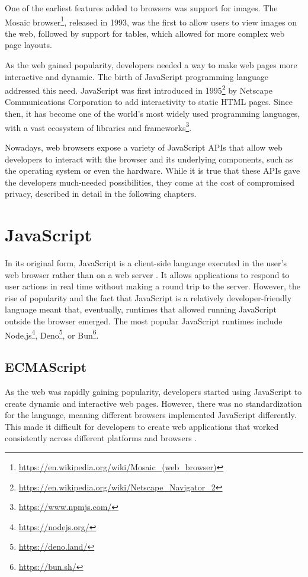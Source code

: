 One of the earliest features added to browsers was support for images. The Mosaic browser\footnote{\url{https://en.wikipedia.org/wiki/Mosaic_(web_browser)}}, released in 1993, was the first to allow users to view images on the web, followed by support for tables, which allowed for more complex web page layouts.

As the web gained popularity, developers needed a way to make web pages more interactive and dynamic. The birth of JavaScript programming language addressed this need. JavaScript was first introduced in 1995\footnote{\url{https://en.wikipedia.org/wiki/Netscape_Navigator_2}} by Netscape Communications Corporation to add interactivity to static HTML pages. Since then, it has become one of the world's most widely used programming languages, with a vast ecosystem of libraries and frameworks\footnote{\url{https://www.npmjs.com/}}.

Nowadays, web browsers expose a variety of JavaScript APIs that allow web developers to interact with the browser and its underlying components, such as the operating system or even the hardware. While it is true that these APIs gave the developers much-needed possibilities, they come at the cost of compromised privacy, described in detail in the following chapters.

\section{JavaScript}
\label{Section:JS}

In its original form, JavaScript is a client-side language executed in the user's web browser rather than on a web server \cite{JSDefinitiveGuide}. It allows applications to respond to user actions in real time without making a round trip to the server. However, the rise of popularity and the fact that JavaScript is a relatively developer-friendly language meant that, eventually, runtimes that allowed running JavaScript outside the browser emerged. The most popular JavaScript runtimes include Node.js\footnote{\url{https://nodejs.org/}}, Deno\footnote{\url{https://deno.land/}}, or Bun\footnote{\url{https://bun.sh/}}.

\subsection{ECMAScript}

As the web was rapidly gaining popularity, developers started using JavaScript to create dynamic and interactive web pages. However, there was no standardization for the language, meaning different browsers implemented JavaScript differently. This made it difficult for developers to create web applications that worked consistently across different platforms and browsers \cite{JSDefinitiveGuide}.

